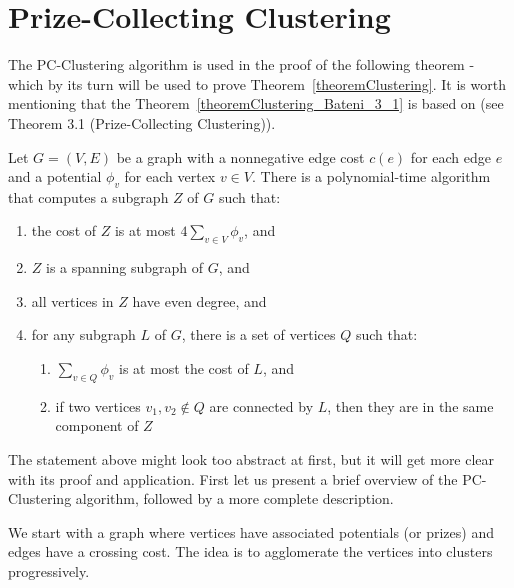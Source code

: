 \section{Prize-Collecting Clustering} \label{section:pc_clustering}

The PC-Clustering algorithm is used in the proof of the following theorem - which by its turn will be used to prove Theorem~\ref{theoremClustering}. 
It is worth mentioning that the Theorem~\ref{theoremClustering_Bateni_3_1} is based on \cite{Bateni} (see Theorem 3.1 (Prize-Collecting Clustering)).

\begin{theorem} \label{theoremClustering_Bateni_3_1}
Let \(G=(V, E)\) be a graph with a nonnegative edge cost \(c(e)\) for each edge \(e\) and a potential \(\phi_v\) for each vertex \(v \in V\). 
There is a polynomial-time algorithm that computes a subgraph \(Z\) of \(G\) such that:

\begin{enumerate}
    \item the cost of \(Z\) is at most \(4 \sum \limits_{v \in V} \phi_v\), and \label{condition:1}
    \item \(Z\) is a spanning subgraph of \(G\), and \label{condition:2}
    \item all vertices in \(Z\) have even degree, and \label{condition:3}
    \item for any subgraph \(L\) of \(G\), there is a set  of vertices \(Q\) such that: \label{condition:4}
    \begin{enumerate}
        \item \(\sum \limits_{v \in Q} \phi_v\) is at most the cost of \(L\), and \label{condition:4a}
        \item if two vertices \(v_1, v_2 \notin Q\) are connected by \(L\), then they are  in the same component of \(Z\) \label{condition:4b}
    \end{enumerate}
\end{enumerate}
\end{theorem}

The statement above might look too abstract at first, but it will get more clear with its proof and application. First let us present a brief overview of the PC-Clustering algorithm, followed by a more complete description.

We start with a graph where vertices have associated potentials (or prizes) and edges have a crossing cost. The idea is to agglomerate the vertices into clusters progressively. 

